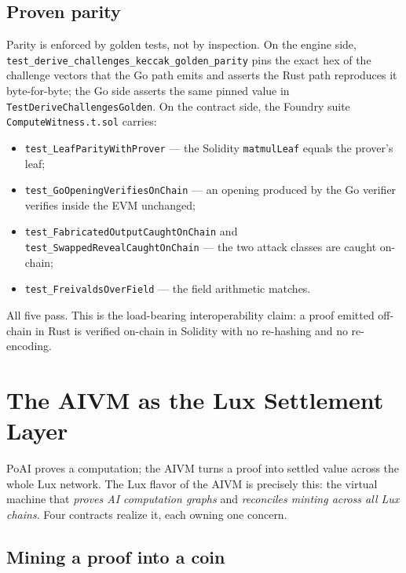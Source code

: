 \documentclass[11pt,a4paper]{article}
\begin{document}
\subsection{Proven parity}

Parity is enforced by golden tests, not by inspection. On the engine side, \texttt{test\_derive\_challenges\_keccak\_golden\_parity} pins the exact hex of the challenge vectors that the Go path emits and asserts the Rust path reproduces it byte-for-byte; the Go side asserts the same pinned value in \texttt{TestDeriveChallengesGolden}. On the contract side, the Foundry suite \texttt{ComputeWitness.t.sol} carries:
\begin{itemize}
  \item \texttt{test\_LeafParityWithProver} --- the Solidity \texttt{matmulLeaf} equals the prover's leaf;
  \item \texttt{test\_GoOpeningVerifiesOnChain} --- an opening produced by the Go verifier verifies inside the EVM unchanged;
  \item \texttt{test\_FabricatedOutputCaughtOnChain} and \texttt{test\_SwappedRevealCaughtOnChain} --- the two attack classes are caught on-chain;
  \item \texttt{test\_FreivaldsOverField} --- the field arithmetic matches.
\end{itemize}
All five pass. This is the load-bearing interoperability claim: a proof emitted off-chain in Rust is verified on-chain in Solidity with no re-hashing and no re-encoding.

\section{The AIVM as the Lux Settlement Layer}\label{sec:settlement}

PoAI proves a computation; the AIVM turns a proof into settled value across the whole Lux network. The Lux flavor of the AIVM is precisely this: the virtual machine that \emph{proves AI computation graphs} and \emph{reconciles minting across all Lux chains}. Four contracts realize it, each owning one concern.

\subsection{Mining a proof into a coin}\label{sec:miner}
\end{document}
